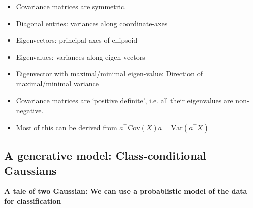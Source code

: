 \begin{itemize}
	\item  Covariance matrices are symmetric.
	\item  Diagonal entries: variances along coordinate-axes
	\item  Eigenvectors: principal axes of ellipsoid
	\item Eigenvalues:  variances along eigen-vectors
	\item Eigenvector with maximal/minimal eigen-value: Direction of maximal/minimal variance 
	\item  Covariance matrices are `positive definite', i.e. all their eigenvalues are non-negative.
	\item  Most of this can be derived from $a^\top \mbox{Cov}(X) a= \mbox{Var}(a^\top X)$
\end{itemize}

\subsection{A generative model: Class-conditional Gaussians}
\textbf{A tale of two Gaussian: We can use a probablistic model of the data for classification} 

